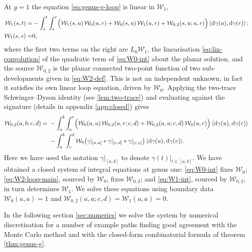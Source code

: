 \documentclass[11pt,a4paper]{article}
\newcommand{\cW}{\mathcal{W}}
\begin{document}
At $g=1$ the equation \eqref{eq:genus-g-loop} is linear in $\cW_1$,
%
\begin{equation}\label{eq:W1-int}
\begin{split}
  \cW_1(s,t) =& - \int_s^t \int_s^r \Bigl(\cW_1(s,u)\,\cW_0(u,r) + \cW_0(s,u)\,\cW_1(u,r) + \cW_{0,2}(s,u;u,r)\Bigr)\,\langle\mathrm d\gamma(u),\mathrm d\gamma(r)\rangle\,;\\
 \cW_1(s,s)=& 0,
\end{split}
\end{equation}
%
where the first two terms on the right are $L_0\cW_1$, the linearisation \eqref{eq:lin-convolution} of the quadratic term of \eqref{eq:W0-int} about the planar solution, and the source $\cW_{0,2}$ is the planar connected two-point function of two sub-developments given in \eqref{eq:W2-def}. This is not an independent unknown, in fact it satisfies its own linear loop equation, driven by $\cW_0$. Applying the two-trace Schwinger--Dyson identity (see \ref{lem:two-trace}) and evaluating against the signature (details in appendix \ref{app:closed}) gives
\begin{equation}\label{eq:W2-loop-main}
\begin{split}
  \cW_{0,2}(a,b;c,d) = {}& - \int_a^b \int_a^r \Bigl(\cW_0(a,u)\,\cW_{0,2}(u,r;c,d) + \cW_{0,2}(a,u;c,d)\,\cW_0(u,r)\Bigr)\,\langle\mathrm d\gamma(u),\mathrm d\gamma(r)\rangle \\
  & - \int_a^b \int_c^d \cW_0\bigl(\gamma|_{[a,u]}*\gamma|_{[v,d]}*\gamma|_{[c,v]}\bigr)\,\langle\mathrm d\gamma(u),\mathrm d\gamma(v)\rangle.
\end{split}
\end{equation}
Here we have used the notation $\gamma|_{[a,b]}$ to denote $\gamma(t)|_{t\in[a,b]}$. We have obtained a closed system of integral equations at genus one: \eqref{eq:W0-int} fixes $\cW_0$; \eqref{eq:W2-loop-main}, sourced by $\cW_0$, fixes $\cW_{0,2}$; and \eqref{eq:W1-int}, sourced by $\cW_{0,2}$, in turn determines $\cW_1$. We solve these equations using boundary data $\cW_0(a,a)=1$ and $\cW_{0,2}(a,a;c,d)=\cW_1(a,a)=0$.


In the following section \ref{sec:numerics} we solve the system by numerical discretisation for a number of example paths finding good agreement with the Monte Carlo method and with the closed-form combinatorial formula of theorem \ref{thm:genus-g}.
\end{document}
